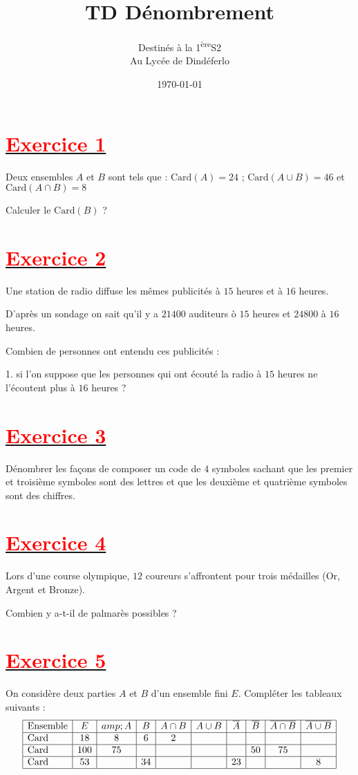 \documentclass[12pt]{article}
\author{Destinés à la 1\textsuperscript{ère}S2\\Au Lycée de Dindéferlo}
\title{\textbf{TD Dénombrement}}
\date{\today}
\begin{document}
\maketitle
\newpage
\section*{\underline{\textbf{\textcolor{red}{Exercice 1}}}}
Deux ensembles $A$ et $B$ sont tels que : $\text{Card}(A)=24$ ; 
$\text{Card}(A\cup B)=46$ et $\text{Card}(A\cap B)=8$

Calculer le $\text{Card}(B)$ ?
\section*{\underline{\textbf{\textcolor{red}{Exercice 2}}}}
Une station de radio diffuse les mêmes publicités à $15$ heures et à $16$ heures.

D'après un sondage on sait qu'il y a $21400$ auditeurs ò $15$ heures et $24800$ à $16$ heures.

Combien de personnes ont entendu ces publicités :

1. si l'on suppose que les personnes qui ont écouté la radio à $15$ heures ne l'écoutent plus à $16$ heures ?
\section*{\underline{\textbf{\textcolor{red}{Exercice 3}}}}
Dénombrer les façons de composer un code de $4$ symboles sachant que les premier et troisième symboles sont des lettres et que les deuxième et quatrième symboles sont des chiffres.
\section*{\underline{\textbf{\textcolor{red}{Exercice 4}}}}
Lors d'une course olympique, $12$ coureurs s'affrontent pour trois médailles (Or, Argent et Bronze).
 
Combien y a-t-il de palmarès possibles ?
\section*{\underline{\textbf{\textcolor{red}{Exercice 5}}}}
On considère deux parties $A$ et $B$ d'un ensemble fini $E.$ Compléter les tableaux suivants :
$$\begin{array}{|l|c|c|c|c|c|c|c|c|c|} \hline \text{Ensemble}&E&amp;A&B&A\cap B&A\cup B&\overline{A}&\overline{B}&\overline{A\cap B}&\overline{A\cup B}\\ \hline \text{Card}&18&8&6&2&&&&&\\ \hline \text{Card}&100&75&&&&&50&75&\\ \hline \text{Card}&53&&34&&&23&&&8\\ \hline \end{array}$$
\end{document}
